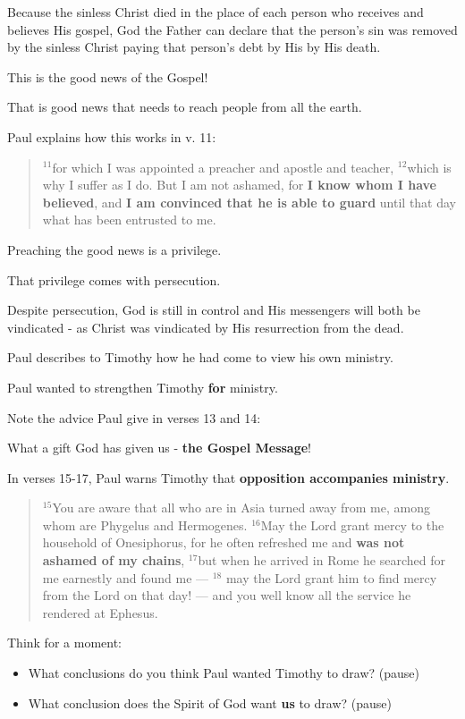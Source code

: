 \documentclass[12pt]{article} %
\newcommand{\superscript}[1]{\ensuremath{^{\textrm{#1}}}}
\begin{document}
Because the sinless Christ died in the place of each person who receives
and believes His gospel, God the Father can declare that the person's
sin was removed by the sinless Christ paying that person's debt by His
by His death.

This is the good news of the Gospel!

That is good news that needs to reach people from all the earth.

Paul explains how this works in v. 11:

\begin{quote}
\superscript{11}for which I was appointed a preacher and apostle
and teacher, \superscript{12}which is why I suffer as I do. But I am not
ashamed, for \textbf{I know whom I have believed}, and
\textbf{I am convinced that he is able to guard}
until that day what has been entrusted to me.
\end{quote}

Preaching the good news is a privilege.

That privilege comes with persecution.

Despite persecution, God is still in control and His messengers will
both be vindicated - as Christ was vindicated by His resurrection from
the dead.

Paul describes to Timothy how he had come to view his own ministry.

Paul wanted to strengthen Timothy \textbf{for} ministry.

Note the advice Paul give in verses 13 and 14:

What a gift God has given us - \textbf{the Gospel Message}!


In verses 15-17, Paul warns Timothy that
\textbf{opposition accompanies ministry}.

\begin{quote}
\superscript{15}You are aware that all who are in Asia turned away
from me, among whom are Phygelus and Hermogenes.
\superscript{16}May the Lord grant mercy to the household
of Onesiphorus, for he often refreshed me and
\textbf{was not ashamed of my chains},
\superscript{17}but when he arrived in Rome he searched for me earnestly
and found me — \superscript{18} may the Lord grant him to find mercy
from the Lord on that day! — and you well know all the service he
rendered at Ephesus.
\end{quote}

Think for a moment:

\begin{itemize}
\item What conclusions do you think Paul wanted Timothy to draw? (pause)
\item What conclusion does the Spirit of God want \textbf{us} to draw? (pause)
\end{itemize}
\end{document}
